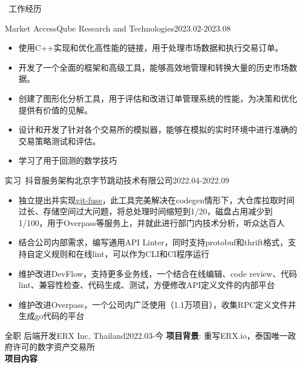 \documentclass[UTF8]{resume}
\begin{document}
\begin{rSection}{\faBriefcase~工作经历}
    \begin{rExperience}{Market Access}{Qube Research and Technologies}{2023.02-2023.08}
        \begin{itemize}
            \itemsep -0.5em \vspace{-0.5em}
            \item 使用C++实现和优化高性能的链接，用于处理市场数据和执行交易订单。
            \item 开发了一个全面的框架和高级工具，能够高效地管理和转换大量的历史市场数据。
            \item 创建了图形化分析工具，用于评估和改进订单管理系统的性能，为决策和优化提供有价值的见解。
            \item 设计和开发了针对各个交易所的模拟器，能够在模拟的实时环境中进行准确的交易策略测试和评估。
            \item 学习了用于回测的数学技巧
        \end{itemize}
    \end{rExperience}
    \begin{rExperience}{实习~抖音服务架构}{北京字节跳动技术有限公司}{2022.04-2022.09}
        \begin{itemize}
            \itemsep -0.5em \vspace{-0.5em}
            \item 独立提出并实现\href{https://github.com/qiujiangkun/git-fuse}{git-fuse}，此工具完美解决在codegen情形下，大仓库拉取时间过长、存储空间过大问题，将总处理时间缩短到1/20，磁盘占用减少到1/100，用于Overpass等服务上，并就此进行部门内技术分析，听众达百人
            \item 结合公司内部需求，编写通用API Linter，同时支持protobuf和thrift格式，支持自定义规则和在线lint，可以作为CLI和CI程序运行
            \item 维护改进DevFlow，支持更多业务线，一个结合在线编辑、code review、代码lint、兼容性检查、代码生成、测试，方便修改API定义文件的内部平台
            \item 维护改进Overpass，一个公司内广泛使用（1.1万项目），收集RPC定义文件并生成go代码的平台
        \end{itemize}
    \end{rExperience}
    \begin{rExperience}{全职 后端开发}{ERX Inc, Thailand}{2022.03-今}
        \textbf{项目背景}:
        重写ERX.io，泰国唯一政府许可的数字资产交易所\\
        \textbf{项目内容}
        \begin{itemize}

\end{itemize}
\end{rExperience}
\end{rSection}
\end{document}
